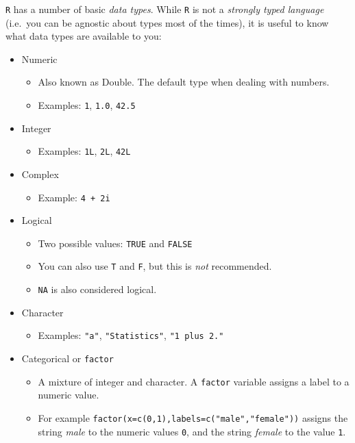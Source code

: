 \documentclass[]{book}
\providecommand{\tightlist}{%
  \setlength{\itemsep}{0pt}\setlength{\parskip}{0pt}}
\theoremstyle{definition}
\theoremstyle{definition}
\theoremstyle{definition}
\theoremstyle{remark}
\begin{document}
\texttt{R} has a number of basic \emph{data types}. While \texttt{R} is
not a \emph{strongly typed language} (i.e.~you can be agnostic about
types most of the times), it is useful to know what data types are
available to you:

\begin{itemize}
\tightlist
\item
  Numeric

  \begin{itemize}
  \tightlist
  \item
    Also known as Double. The default type when dealing with numbers.
  \item
    Examples: \texttt{1}, \texttt{1.0}, \texttt{42.5}
  \end{itemize}
\item
  Integer

  \begin{itemize}
  \tightlist
  \item
    Examples: \texttt{1L}, \texttt{2L}, \texttt{42L}
  \end{itemize}
\item
  Complex

  \begin{itemize}
  \tightlist
  \item
    Example: \texttt{4\ +\ 2i}
  \end{itemize}
\item
  Logical

  \begin{itemize}
  \tightlist
  \item
    Two possible values: \texttt{TRUE} and \texttt{FALSE}
  \item
    You can also use \texttt{T} and \texttt{F}, but this is \emph{not}
    recommended.
  \item
    \texttt{NA} is also considered logical.
  \end{itemize}
\item
  Character

  \begin{itemize}
  \tightlist
  \item
    Examples: \texttt{"a"}, \texttt{"Statistics"},
    \texttt{"1\ plus\ 2."}
  \end{itemize}
\item
  Categorical or \texttt{factor}

  \begin{itemize}
  \tightlist
  \item
    A mixture of integer and character. A \texttt{factor} variable
    assigns a label to a numeric value.
  \item
    For example \texttt{factor(x=c(0,1),labels=c("male","female"))}
    assigns the string \emph{male} to the numeric values \texttt{0}, and
    the string \emph{female} to the value \texttt{1}.
  \end{itemize}
\end{itemize}
\end{document}
